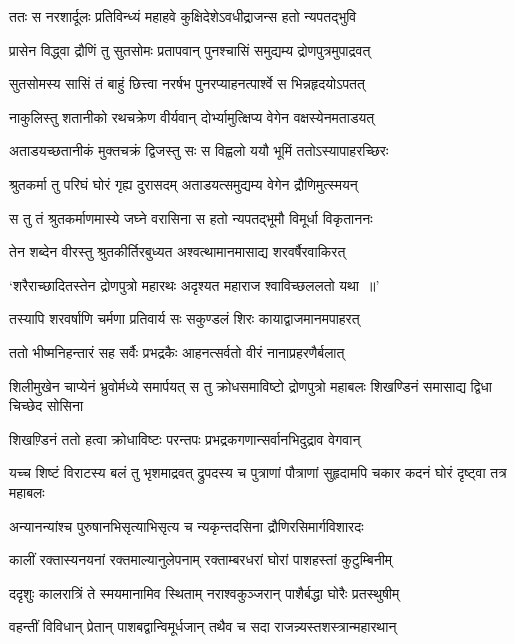 \twolineshloka
{ततः स नरशार्दूलः प्रतिविन्ध्यं महाहवे}
{कुक्षिदेशेऽवधीद्राजन्स हतो न्यपतद्भुवि}


\twolineshloka
{प्रासेन विद्ध्वा द्रौणिं तु सुतसोमः प्रतापवान्}
{पुनश्चासिं समुद्यम्य द्रोणपुत्रमुपाद्रवत्}


\twolineshloka
{सुतसोमस्य सासिं तं बाहुं छित्त्वा नरर्षभ}
{पुनरप्याहनत्पार्श्वे स भिन्नहृदयोऽपतत्}


\twolineshloka
{नाकुलिस्तु शतानीको रथचक्रेण वीर्यवान्}
{दोर्भ्यामुत्क्षिप्य वेगेन वक्षस्येनमताडयत्}


\twolineshloka
{अताडयच्छतानीकं मुक्तचक्रं द्विजस्तु सः}
{स विह्वलो ययौ भूमिं ततोऽस्यापाहरच्छिरः}


\twolineshloka
{श्रुतकर्मा तु परिघं घोरं गृह्य दुरासदम्}
{अताडयत्समुद्यम्य वेगेन द्रौणिमुत्स्मयन्}


\twolineshloka
{स तु तं श्रुतकर्माणमास्ये जघ्ने वरासिना}
{स हतो न्यपतद्भूमौ विमूर्धा विकृताननः}


\twolineshloka
{तेन शब्देन वीरस्तु श्रुतकीर्तिरबुध्यत}
{अश्वत्थामानमासाद्य शरवर्षैरवाकिरत्}


\twolineshloka
{`शरैराच्छादितस्तेन द्रोणपुत्रो महारथः}
{अदृश्यत महाराज श्वाविच्छललतो यथा ॥'}


\twolineshloka
{तस्यापि शरवर्षाणि चर्मणा प्रतिवार्य सः}
{सकुण्डलं शिरः कायाद्वाजमानमपाहरत्}


\twolineshloka
{ततो भीष्मनिहन्तारं सह सर्वैः प्रभद्रकैः}
{आहनत्सर्वतो वीरं नानाप्रहरणैर्बलात्}


शिलीमुखेन चाप्येनं भ्रुवोर्मध्ये समार्पयत्
\twolineshloka
{स तु क्रोधसमाविष्टो द्रोणपुत्रो महाबलः}
{शिखण्डिनं समासाद्य द्विधा चिच्छेद सोसिना}


\twolineshloka
{शिखण़्डिनं ततो हत्वा क्रोधाविष्टः परन्तपः}
{प्रभद्रकगणान्सर्वानभिदुद्राव वेगवान्}


\threelineshloka
{यच्च शिष्टं विराटस्य बलं तु भृशमाद्रवत्}
{द्रुपदस्य च पुत्राणां पौत्राणां सुहृदामपि}
{चकार कदनं घोरं दृष्ट्वा तत्र महाबलः}


\twolineshloka
{अन्यानन्यांश्च पुरुषानभिसृत्याभिसृत्य च}
{न्यकृन्तदसिना द्रौणिरसिमार्गविशारदः}


\twolineshloka
{कालीं रक्तास्यनयनां रक्तमाल्यानुलेपनाम्}
{रक्ताम्बरधरां घोरां पाशहस्तां कुटुम्बिनीम्}


\twolineshloka
{ददृशुः कालरात्रिं ते स्मयमानामिव स्थिताम्}
{नराश्वकुञ्जरान् पाशैर्बद्धा घोरैः प्रतस्थुषीम्}


\twolineshloka
{वहन्तीं विविधान् प्रेतान् पाशबद्वान्विमूर्धजान्}
{तथैव च सदा राजन्न्यस्तशस्त्रान्महारथान्}


